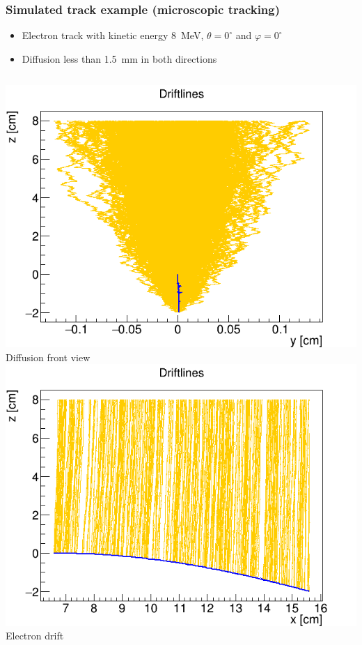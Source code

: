 \documentclass{beamer}
\begin{document}
	\begin{frame}
		\frametitle{Simulated track example (microscopic tracking)}
		\begin{itemize}
			\item Electron track with kinetic energy 8~MeV, $\theta = 0^\circ$ and $\varphi = 0^\circ$
			\item Diffusion less than 1.5~mm in both directions
		\end{itemize}
		\vspace{0.5cm}
		\begin{columns}
				\centering
				\includegraphics[width = 0.95 \linewidth]{../images/drift_yz.png}
				Diffusion front view
				\centering
				\includegraphics[width = 0.95 \linewidth]{../images/drift_xz.png}
				Electron drift

\end{columns}
\end{frame}
\end{document}

